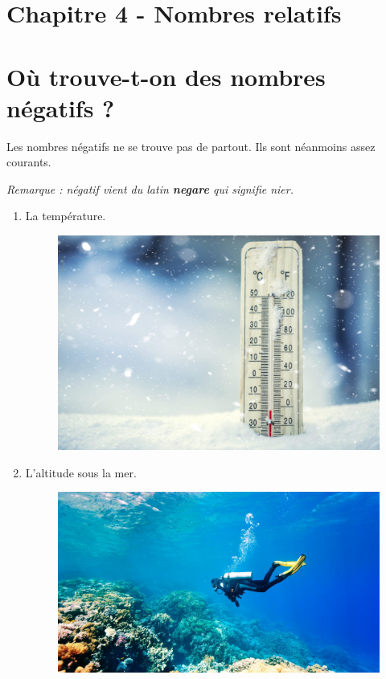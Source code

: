 



\horrule{2px}
\section*{Chapitre 4 - Nombres relatifs}
\horrule{2px}

\section*{Où trouve-t-on des nombres négatifs ?}

Les nombres négatifs ne se trouve pas de partout. Ils sont néanmoins assez courants.

\textit{Remarque : négatif vient du latin \textbf{negare} qui signifie nier.}

\begin{multicols}{2}
\begin{enumerate}
  \item[1.] La température.
  \begin{figure}[H]
    \centering
    \includegraphics[width=0.8\linewidth]{5x4-relatifs/c-temp.png}
  \end{figure}
  \item[2.] L'altitude sous la mer.
  \begin{figure}[H]
    \centering
    \includegraphics[width=0.8\linewidth]{5x4-relatifs/c-plongee.png}
  \end{figure}
\end{enumerate}
\end{multicols}


